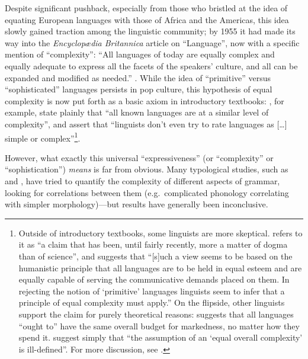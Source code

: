 \documentclass[12pt,twoside]{article}
\begin{document}
Despite significant pushback, especially from those who bristled at the idea of equating European languages with those of Africa and the Americas, this idea slowly gained traction among the linguistic community; by 1955 it had made its way into the \emph{Encyclopædia Britannica} article on ``Language'', now with a specific mention of ``complexity'': ``All languages of today are equally complex and equally adequate to express all the facets of the speakers' culture, and all can be expanded and modified as needed.'' \citep[698]{trager}. While the idea of ``primitive'' versus ``sophisticated'' languages persists in pop culture, this hypothesis of equal complexity is now put forth as a basic axiom in introductory textbooks: \citet[8]{akmajian}, for example, state plainly that ``all known languages are at a similar level of complexity'', and \citet[8]{ogrady} assert that ``linguists don't even try to rate languages as [\ldots] simple or complex''\footnote{Outside of introductory textbooks, some linguists are more skeptical. \citet[2]{shosted} refers to it as ``a claim that has been, until fairly recently, more a matter of dogma than of science'', and \citet[216]{maddieson} suggests that ``[s]uch a view seems to be based on the humanistic principle that all languages are to be held in equal esteem and are equally capable of serving the communicative demands placed on them. In rejecting the notion of `primitive' languages linguists seem to infer that a principle of equal complexity must apply.'' On the flipside, other linguists support the claim for purely theoretical reasons: \citet[165-166]{chomsky} suggests that all languages ``ought to'' have the same overall budget for markedness, no matter how they spend it. \citet[540]{pellegrino} suggest simply that ``the assumption of an `equal overall complexity' is ill-defined''. For more discussion, see \citet{joseph}.}.


However, what exactly this universal ``expressiveness'' (or ``complexity'' or ``sophistication'') \emph{means} is far from obvious. Many typological studies, such as \citet{maddieson} and \citet{shosted}, have tried to quantify the complexity of different aspects of grammar, looking for correlations between them (e.g.\ complicated phonology correlating with simpler morphology)---but results have generally been inconclusive.
\end{document}
